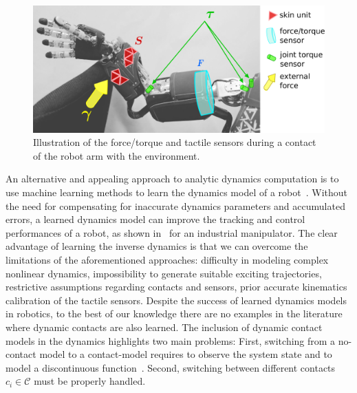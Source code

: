     \begin{figure}[t]
        \centering
        \includegraphics[width=.6\columnwidth]{robertoICRA/fig/concept_gray_new}		
        \caption{Illustration of the force/torque and tactile sensors during a contact of the robot arm with the environment.}
        \label{fig:concept}
        \figspace
    \end{figure}
An alternative and appealing approach to analytic dynamics computation is to use machine learning methods to learn the dynamics model of a robot~\cite{Nguyen-Tuong2008,Vijayakumar2000,Deisenroth2012}. 
Without the need for compensating for inaccurate dynamics parameters and accumulated errors, a learned dynamics model can improve the tracking and control performances of a robot, as shown in~\cite{Nguyen-Tuong2011} for an industrial manipulator.
The clear advantage of learning the inverse dynamics is that we can overcome the limitations of the aforementioned approaches: difficulty in modeling complex nonlinear dynamics, impossibility to generate suitable exciting trajectories, restrictive assumptions regarding contacts and sensors, prior accurate kinematics calibration of the tactile sensors.
Despite the success of learned dynamics models in robotics, to the best of our knowledge there are no examples in the literature where dynamic contacts are also learned. 
The inclusion of dynamic contact models in the dynamics highlights two main problems:
First, switching from a no-contact model to a contact-model requires to observe the system state and to model a discontinuous function~\cite{Toussaint2005}. 
Second, switching between different contacts $c_i \in\mathcal{C}$ must be properly handled. %

